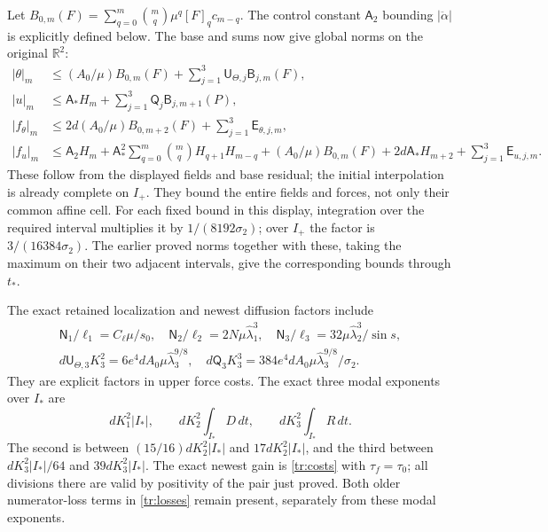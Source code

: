 Let $B_{0,m}(F)=\sum_{q=0}^m\binom mq\mu^q[F]_qc_{m-q}$.
The control constant $\mathsf A_2$ bounding $|\ddot\alpha|$
is explicitly defined below. The base and sums now give global norms
on the original $\mathbb R^2$:
\begin{align}\label{trls:globalnorms}
 |\theta|_m&\leq(A_0/\mu)B_{0,m}(F)
       +\sum_{j=1}^3\mathsf U_{\Theta,j}\mathsf B_{j,m}(F),
 \nonumber\\
 |u|_m&\leq\mathsf A_*H_m
       +\sum_{j=1}^3\mathsf Q_j\mathsf B_{j,m+1}(P),\nonumber\\
 |f_\theta|_m&\leq2d(A_0/\mu)B_{0,m+2}(F)
                       +\sum_{j=1}^3\mathsf E_{\theta,j,m},\\
 |f_u|_m&\leq\mathsf A_2H_m
       +\mathsf A_*^2\sum_{q=0}^m\binom mqH_{q+1}H_{m-q}
       +(A_0/\mu)B_{0,m}(F)+2d\mathsf A_*H_{m+2}
                       +\sum_{j=1}^3\mathsf E_{u,j,m}.\nonumber
\end{align}
These follow from the displayed fields and base residual; the
initial interpolation is already complete on $I_+$. They bound
the entire fields and forces, not only their common affine cell.
For each fixed bound in this display, integration over the required
interval multiplies it by $1/(8192\sigma_2)$; over $I_+$ the
factor is $3/(16384\sigma_2)$. The earlier proved norms together
with these, taking the maximum on their two adjacent intervals,
give the corresponding bounds through $t_*$.

The exact retained localization and newest diffusion factors include
\begin{equation}\label{trls:frequencycost}
 \begin{gathered}
 \mathsf N_1/\ell_1=C_\ell\mu/s_0,\quad
 \mathsf N_2/\ell_2=2N\mu\widehat\lambda_1^3,\quad
 \mathsf N_3/\ell_3=
                32\mu\widehat\lambda_2^3/\sin s,\\
 d\mathsf U_{\Theta,3}K_3^2
       =6e^4dA_0\mu\widehat\lambda_3^{9/8},\quad
 d\mathsf Q_3K_3^3
       =384e^4dA_0\mu\widehat\lambda_3^{9/8}/\sigma_2.
 \end{gathered}
\end{equation}
They are explicit factors in upper force costs. The exact three
modal exponents over $I_*$ are
\begin{equation}\label{trls:exponents}
 dK_1^2|I_*|,\qquad dK_2^2\int_{I_*}D\,dt,\qquad
 dK_3^2\int_{I_*}R\,dt.
\end{equation}
The second is between $(15/16)dK_2^2|I_*|$ and
$17dK_2^2|I_*|$, and the third between
$dK_3^2|I_*|/64$ and $39dK_3^2|I_*|$.
The exact newest gain is \eqref{tr:costs} with
$\tau_f=\tau_0$; all divisions there are valid by positivity
of the pair just proved. Both older numerator-loss terms in
\eqref{tr:losses} remain present, separately from these modal
exponents.


